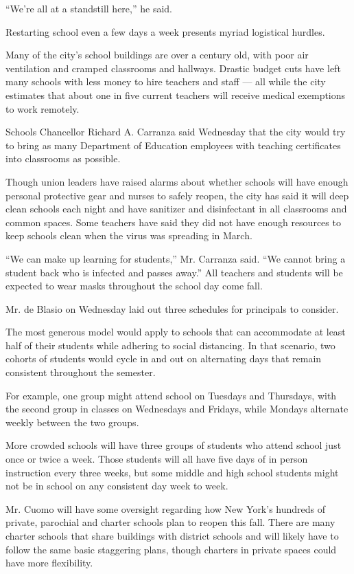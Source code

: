 ``We're all at a standstill here,'' he said.

Restarting school even a few days a week presents myriad logistical
hurdles.

Many of the city's school buildings are over a century old, with poor
air ventilation and cramped classrooms and hallways. Drastic budget cuts
have left many schools with less money to hire teachers and staff ---
all while the city estimates that about one in five current teachers
will receive medical exemptions to work remotely.

Schools Chancellor Richard A. Carranza said Wednesday that the city
would try to bring as many Department of Education employees with
teaching certificates into classrooms as possible.

Though union leaders have raised alarms about whether schools will have
enough personal protective gear and nurses to safely reopen, the city
has said it will deep clean schools each night and have sanitizer and
disinfectant in all classrooms and common spaces. Some teachers have
said they did not have enough resources to keep schools clean when the
virus was spreading in March.

``We can make up learning for students,'' Mr. Carranza said. ``We cannot
bring a student back who is infected and passes away.'' All teachers and
students will be expected to wear masks throughout the school day come
fall.

Mr. de Blasio on Wednesday laid out three schedules for principals to
consider.

The most generous model would apply to schools that can accommodate at
least half of their students while adhering to social distancing. In
that scenario, two cohorts of students would cycle in and out on
alternating days that remain consistent throughout the semester.

For example, one group might attend school on Tuesdays and Thursdays,
with the second group in classes on Wednesdays and Fridays, while
Mondays alternate weekly between the two groups.

More crowded schools will have three groups of students who attend
school just once or twice a week. Those students will all have five days
of in person instruction every three weeks, but some middle and high
school students might not be in school on any consistent day week to
week.

Mr. Cuomo will have some oversight regarding how New York's hundreds of
private, parochial and charter schools plan to reopen this fall. There
are many charter schools that share buildings with district schools and
will likely have to follow the same basic staggering plans, though
charters in private spaces could have more flexibility.

